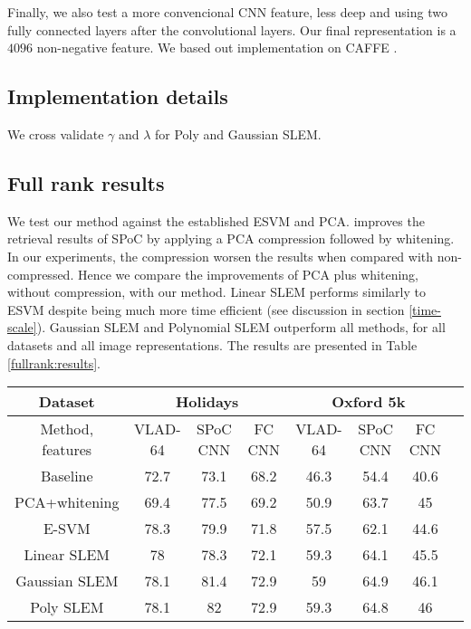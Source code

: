 Finally, we also test a more convencional CNN feature, less deep and using two fully connected layers after the convolutional layers.
Our final representation is a $4096$ non-negative feature. We based out implementation on CAFFE \cite{jia2014caffe}.


\subsection{Implementation details}
We cross validate $\gamma$ and $\lambda$ for Poly and Gaussian SLEM.

\subsection{Full rank results}

We test our method against the established ESVM and PCA.
\cite{babenko15} improves the retrieval results of SPoC by applying a PCA compression followed by whitening. In our experiments, the compression worsen the results when compared with non-compressed.
Hence we compare the improvements of PCA plus whitening, without compression, with our method.
Linear SLEM performs similarly to ESVM despite being much more time efficient (see discussion in section \ref{time-scale}).
Gaussian SLEM and Polynomial SLEM outperform all methods, for all datasets and all image representations.
The results are presented in Table \ref{fullrank:results}.

\begin{table*}[t]
\begin{center}
\caption{Mean average precision results for INRIA Holidays and Oxford buildings datasets, expressed as percentages. In this table, we present our results for VLAD-64 \ref{VLAD}, sum-pooling of convolutional features (SPoC) \ref{babenko15} and fully connected (fc) CNN \ref{jia2014caffe}}
\begin{tabular}{|c|c|c|c|c|c|c|c|}
\hline
Dataset & \multicolumn{3}{|c|}{\textbf{Holidays}} & \multicolumn{3}{|c|}{\textbf{Oxford 5k}}\\
\hline
Method, features & VLAD-64  & SPoC CNN & FC CNN & VLAD-64 & SPoC CNN & FC CNN\\
\hline\hline
Baseline            & 72.7 & 73.1 & 68.2  & 46.3 & 54.4 & 40.6\\
PCA+whitening       & 69.4 & 77.5 & 69.2 & 50.9  & 63.7 & 45 \\
E-SVM               & 78.3 & 79.9 & 71.8 & 57.5  & 62.1 & 44.6\\
Linear SLEM         & 78   & 78.3 & 72.1 & 59.3  & 64.1 & 45.5\\
Gaussian SLEM       & 78.1 & 81.4 & 72.9 & 59    & 64.9 & 46.1\\
Poly SLEM           & 78.1 &  82  & 72.9 & 59.3  & 64.8 & 46\\
\hline
\end{tabular}
\end{center}
\label{fullrank:results}
\end{table*}

